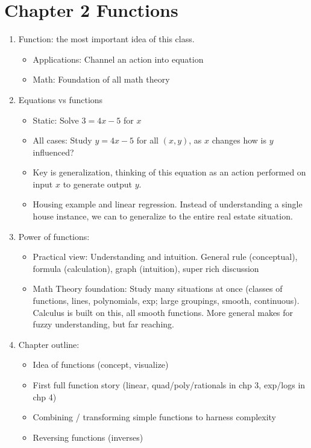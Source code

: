 \documentclass{article}
\begin{document}
\section{Chapter 2 Functions}

\begin{enumerate}
\item Function: the most important idea of this class.
\begin{itemize}
\item Applications: Channel an action into equation
\item Math: Foundation of all math theory
\end{itemize}

\item Equations vs functions
\begin{itemize}
\item Static: Solve $3=4x-5$ for $x$
\item All cases: Study $y=4x-5$ for all $(x,y)$, as $x$ changes how is $y$ influenced?
\item Key is generalization, thinking of this equation as an action performed on input $x$ to generate output $y$.
\item Housing example and linear regression. Instead of understanding a single house instance, we can to generalize to the entire real estate situation.
\end{itemize}

\item Power of functions:
\begin{itemize}
\item Practical view: Understanding and intuition. General rule (conceptual), formula (calculation), graph (intuition), super rich discussion
\item Math Theory foundation: Study many situations at once (classes of functions, lines, polynomials, exp; large groupings, smooth, continuous). Calculus is built on this, all smooth functions. More general makes for fuzzy understanding, but far reaching.
\end{itemize}

\item Chapter outline:
\begin{itemize}
\item Idea of functions (concept, visualize)
\item First full function story (linear, quad/poly/rationals in chp 3, exp/logs in chp 4)
\item Combining / transforming simple functions to harness complexity
\item Reversing functions (inverses)
\end{itemize}


\end{enumerate}
\end{document}
